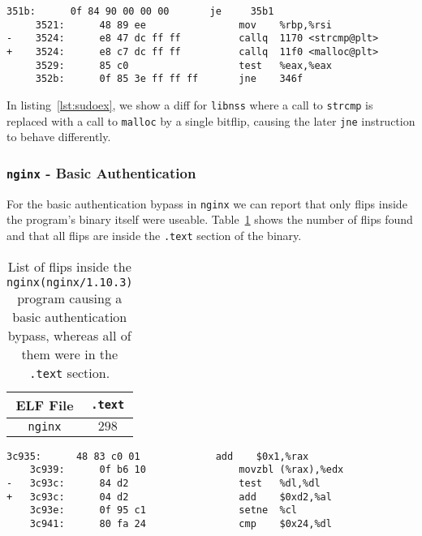 \begin{minipage}{\linewidth}
\begin{lstlisting}[style=diff,
                   caption={Diff for a bitflip applied to \texttt{libnss} in
order to bypass a user privilege check. The call to \texttt{strcmp} is
replaced because of the offset in the lookuptable being one off.},
label=lst:sudoex]
     351b:      0f 84 90 00 00 00       je     35b1
     3521:      48 89 ee                mov    %rbp,%rsi
-    3524:      e8 47 dc ff ff          callq  1170 <strcmp@plt>
+    3524:      e8 c7 dc ff ff          callq  11f0 <malloc@plt>
     3529:      85 c0                   test   %eax,%eax
     352b:      0f 85 3e ff ff ff       jne    346f
\end{lstlisting}
\end{minipage}

In listing~\ref{lst:sudoex}, we show a diff for \texttt{libnss} where a call to
\texttt{strcmp} is replaced with a call to \texttt{malloc} by a single bitflip,
causing the later \texttt{jne} instruction to behave differently.

\subsubsection{\texttt{nginx} - Basic Authentication}

For the basic authentication bypass in \texttt{nginx} we can report that only
flips inside the program's binary itself were useable. Table~\ref{tab:nginxres}
shows the number of flips found and that all flips are inside the \texttt{.text}
section of the binary.

\begin{table}[]
\centering
\begin{tabular}{c|c}
ELF File               & \texttt{.text} \\ \hline
\texttt{nginx}         & $298$
\end{tabular}
\caption{List of flips inside the \texttt{nginx(nginx/1.10.3)} program causing a
basic authentication bypass, whereas all of them were in the \texttt{.text}
section.}
\label{tab:nginxres}
\end{table}

\begin{minipage}{\linewidth}
\begin{lstlisting}[style=diff,
                   caption={Diff for a bitflip applied to the \texttt{nginx}
binary in order to bypass a credential check. The call to \texttt{test} is
replaced by \texttt{add} which doesn't chage a register the \texttt{setne}
instruction would check.},
label=lst:nginxex]
    3c935:      48 83 c0 01             add    $0x1,%rax
    3c939:      0f b6 10                movzbl (%rax),%edx
-   3c93c:      84 d2                   test   %dl,%dl
+   3c93c:      04 d2                   add    $0xd2,%al
    3c93e:      0f 95 c1                setne  %cl
    3c941:      80 fa 24                cmp    $0x24,%dl
\end{lstlisting}
\end{minipage}

